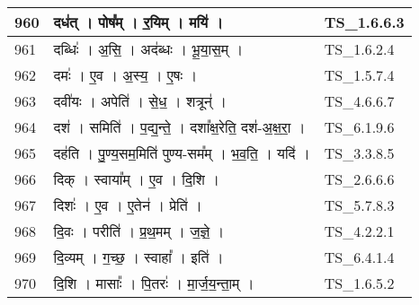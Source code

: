 \documentclass[17pt]{extarticle}
\begin{document}
\begin{longtable}{||p{0.4in}||p{4.9in}||p{0.9in}||}
    \hline
        
    960 & दध॑त्   ।   पोष᳚म्   ।   र॒यिम्   ।   मयि॑   ।    & TS\_1.6.6.3       \\
    
    \hline
        
    961 & दब्धिः॑   ।   अ॒सि॒   ।   अद॑ब्धः   ।   भू॒या॒स॒म्   ।    & TS\_1.6.2.4       \\
    
    \hline
        
    962 & दमः॑   ।   ए॒व   ।   अ॒स्य॒   ।   ए॒षः   ।    & TS\_1.5.7.4       \\
    
    \hline
        
    963 & दवी॑यः   ।   अपेति॑   ।   से॒ध॒   ।   शत्रून्॑   ।    & TS\_4.6.6.7       \\
    
    \hline
        
    964 & दश॑   ।   समिति॑   ।   प॒द्य॒न्ते॒   ।   दशा᳚क्ष॒रेति॒ दश॑{-}अ॒क्ष॒रा॒   ।    & TS\_6.1.9.6       \\
    
    \hline
        
    965 & दह॑ति   ।   पु॒ण्य॒सम॒मिति॑ पुण्य{-}सम᳚म्   ।   भ॒व॒ति॒   ।   यदि॑   ।    & TS\_3.3.8.5       \\
    
    \hline
        
    966 & दिक्   ।   स्वाया᳚म्   ।   ए॒व   ।   दि॒शि   ।    & TS\_2.6.6.6       \\
    
    \hline
        
    967 & दिशः॑   ।   ए॒व   ।   ए॒तेन॑   ।   प्रेति॑   ।    & TS\_5.7.8.3       \\
    
    \hline
        
    968 & दि॒वः   ।   परीति॑   ।   प्र॒थ॒मम्   ।   ज॒ज्ञे॒   ।    & TS\_4.2.2.1       \\
    
    \hline
        
    969 & दि॒व्यम्   ।   ग॒च्छ॒   ।   स्वाहा᳚   ।   इति॑   ।    & TS\_6.4.1.4       \\
    
    \hline
        
    970 & दि॒शि   ।   मासाः᳚   ।   पि॒तरः॑   ।   मा॒र्ज॒य॒न्ता॒म्   ।    & TS\_1.6.5.2       \\
    
    \hline
        

\end{longtable}
\end{document}
